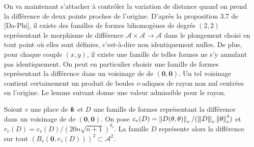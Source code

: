 \documentclass[11pt, twoside, a4paper, french]{article}
\numberwithin{equation}{section}
\newcommand{\nv}[2][v]{\left\lVert#2\right\rVert_{#1}} 		%
\newcommand{\nnv}[2][v]{\left\lvert\hspace{-1pt}\left\lvert\hspace{-1pt}\left\lvert#2\right\rvert\hspace{-1pt}\right\rvert\hspace{-1pt}\right\rvert_{#1}}
\newcommand{\dv}{{\delta_v}} 					%
\newcommand{\A}{\mathcal{A}} 					%
\newcommand{\p}[1]{{\boldsymbol{#1}}} 				%
\newcommand{\OA}{\p{0}} 					%
\newcommand{\coa}{\theta} 					%
\begin{document}
On va maintenant s'attacher à contrôler la variation de distance quand on prend la différence de deux points proches de l'origine. D'après la proposition 3.7 de [Da-Phi], il existe des familles de formes bihomogènes de degrés $(2, 2)$ représentant le morphisme de différence $\A\times\A \to \A$ dans le plongement choisi en tout point où elles sont définies, c'est-à-dire non identiquement nulles. De plus, pour chaque couple $(x, y)$, il existe une famille de telles formes ne s'y annulant pas identiquement. On peut en particulier choisir une famille de formes représentant la différence dans un voisinage de  de $(\OA, \OA)$. Un tel voisinage contient certainement un produit de boules $v$-adiques de rayon non nul centrées en l'origine. Le lemme suivant donne une valeur admissible pour le rayon.

\begin{lem} \label{rayonRel}
Soient $v$ une place de $\boldsymbol{k}$ et $D$ une famille de formes représentant la différence dans un voisinage de  de $(\OA, \OA)$. On pose $c_v(D) = \nv{D(\coa, \coa)}/(\nnv{D}\nv{\coa}^4)$ et $r_v(D) = c_v(D)/(20n\sqrt{n+1})^\dv$. La famille $D$ représente alors la différence sur tout $(B_v(\OA, r_v(D)))^2 \subset \A^2$.
\end{lem}
\end{document}
